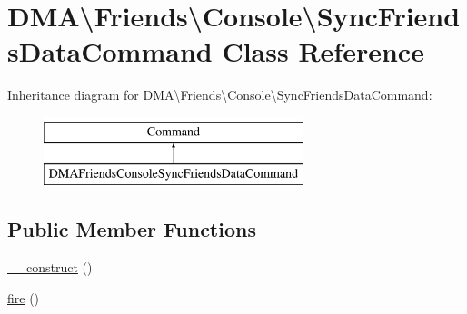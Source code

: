 \hypertarget{classDMA_1_1Friends_1_1Console_1_1SyncFriendsDataCommand}{\section{D\-M\-A\textbackslash{}Friends\textbackslash{}Console\textbackslash{}Sync\-Friends\-Data\-Command Class Reference}
\label{classDMA_1_1Friends_1_1Console_1_1SyncFriendsDataCommand}
}
Inheritance diagram for D\-M\-A\textbackslash{}Friends\textbackslash{}Console\textbackslash{}Sync\-Friends\-Data\-Command\-:\begin{figure}[H]
\begin{center}
\leavevmode
\includegraphics[height=2.000000cm]{d1/dfb/classDMA_1_1Friends_1_1Console_1_1SyncFriendsDataCommand}
\end{center}
\end{figure}
\subsection*{Public Member Functions}
\begin{DoxyCompactItemize}
\item 
\hyperlink{classDMA_1_1Friends_1_1Console_1_1SyncFriendsDataCommand_a1fba6962dc1edd7eca63cd6d467f53b9}{\-\_\-\-\_\-construct} ()
\item 
\hyperlink{classDMA_1_1Friends_1_1Console_1_1SyncFriendsDataCommand_acadcd5594f052ee5f2604834ddc8c5cb}{fire} ()
\end{DoxyCompactItemize}
